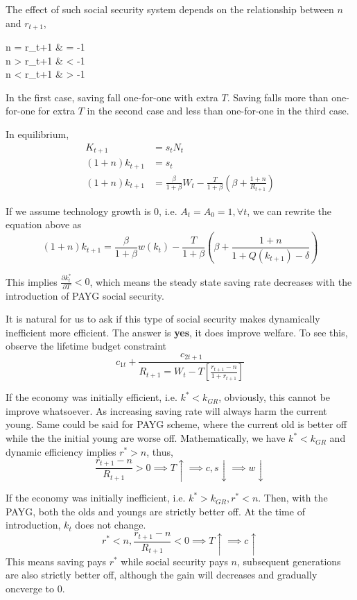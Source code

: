 \documentclass[twocolumn, fleqn]{article}
\begin{document}
			The effect of such social security system depends on the relationship between $n$ and $r_{t+1}$,

			\begin{cases}
				n = r_{t+1} &  = -1\\
				n > r_{t+1} &  < -1\\
				n < r_{t+1} &  > -1
			\end{cases}

			In the first case, saving fall one-for-one with extra $T$.
			Saving falls more than one-for-one for extra $T$ in the second case and less than one-for-one in the
			third case.

			In equilibrium,
			\begin{align*}
				K_{t+1}&= s_t N_t \\
				(1+n)k_{t+1} &= s_t\\
				(1+n)k_{t+1} &= \frac{\beta}{1+\beta}W_t - \frac{T}{1+\beta}(\beta + \frac{1+n}{R_{t+1}})
			\end{align*}

			If we assume technology growth is 0, i.e. $A_t = A_0 = 1, \forall t$, we can rewrite the equation above as
			\[(1+n)k_{t+1} = \frac{\beta}{1+\beta}w(k_t) - \frac{T}{1+\beta}
			\left(\beta + \frac{1+n}{1+Q(k_{t+1})-\delta}\right)\]

			This implies $\frac{\partial k_t^\ast}{\partial T}<0$, which means the steady state saving rate
			decreases with the introduction of PAYG social security.

			It is natural for us to ask if this type of social security makes dynamically inefficient more efficient.
			The answer is \textbf{yes}, it does improve welfare.
			To see this, observe the lifetime budget constraint
			\[c_{1t}+\frac{c_{2t+1}}{R_{t+1}=W_t - T\left[ \frac{r_{t+1}-n}{1+r_{t+1}} \right]}\]

			If the economy was initially efficient, i.e. $k^\ast < k_{GR}$, obviously, this cannot be improve
			whatsoever.
			As increasing saving rate will always harm the current young.
			Same could be said for PAYG scheme, where the current old is better off while the the initial young are
			worse off.
			Mathematically, we have $k^\ast < k_{GR}$ and dynamic efficiency implies $r^\ast >n$, thus,
			\[\frac{r_{t+1}-n}{R_{t+1}}>0 \implies T \uparrow \implies c, s \downarrow \implies w \downarrow\]

			If the economy was initially inefficient, i.e. $k^\ast > k_{GR}, r^\ast <n$.
			Then, with the PAYG, both the olds and youngs are strictly better off.
			At the time of introduction, $k_t$ does not change.
			\[r^\ast <n, \frac{r_{t+1}-n}{R_{t+1}}<0 \implies T \uparrow \implies c \uparrow\]
			This means saving pays $r^\ast$ while social security pays $n$, subsequent generations are also strictly
			better off, although the gain will decreases and gradually oncverge to 0.
\end{document}
